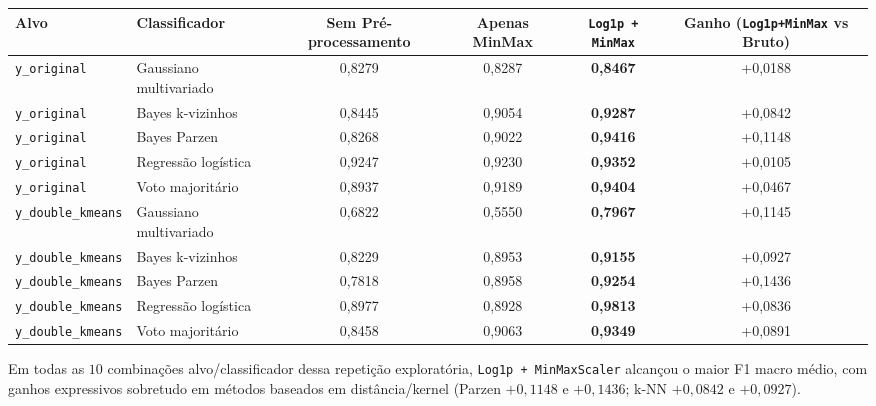 \documentclass[a4paper,11pt]{article}
\begin{document}
\begin{center}
\begin{minipage}{\linewidth}
\centering
{}
\footnotesize
\sloppy
\setlength{\tabcolsep}{2.5pt}
\renewcommand{\arraystretch}{1.18}
\begin{tabularx}{\linewidth}{P{2.25cm} P{2.85cm} C C C C}
\toprule
\textbf{Alvo} & \textbf{Classificador} & \textbf{Sem Pré-processamento} & \textbf{Apenas MinMax} & \textbf{\texttt{Log1p + MinMax}} & \textbf{Ganho (\texttt{Log1p+MinMax} vs Bruto)} \\
\midrule
\texttt{y\_\allowbreak original} & Gaussiano multivariado & 0,8279 & 0,8287 & \textbf{0,8467} & +0,0188 \\
\texttt{y\_\allowbreak original} & Bayes k-vizinhos & 0,8445 & 0,9054 & \textbf{0,9287} & +0,0842 \\
\texttt{y\_\allowbreak original} & Bayes Parzen & 0,8268 & 0,9022 & \textbf{0,9416} & +0,1148 \\
\texttt{y\_\allowbreak original} & Regressão logística & 0,9247 & 0,9230 & \textbf{0,9352} & +0,0105 \\
\texttt{y\_\allowbreak original} & Voto majoritário & 0,8937 & 0,9189 & \textbf{0,9404} & +0,0467 \\
\texttt{y\_\allowbreak double\_\allowbreak kmeans} & Gaussiano multivariado & 0,6822 & 0,5550 & \textbf{0,7967} & +0,1145 \\
\texttt{y\_\allowbreak double\_\allowbreak kmeans} & Bayes k-vizinhos & 0,8229 & 0,8953 & \textbf{0,9155} & +0,0927 \\
\texttt{y\_\allowbreak double\_\allowbreak kmeans} & Bayes Parzen & 0,7818 & 0,8958 & \textbf{0,9254} & +0,1436 \\
\texttt{y\_\allowbreak double\_\allowbreak kmeans} & Regressão logística & 0,8977 & 0,8928 & \textbf{0,9813} & +0,0836 \\
\texttt{y\_\allowbreak double\_\allowbreak kmeans} & Voto majoritário & 0,8458 & 0,9063 & \textbf{0,9349} & +0,0891 \\
\bottomrule
\end{tabularx}
\end{minipage}
\end{center}


Em todas as $10$ combinações alvo/classificador dessa repetição exploratória, \texttt{Log1p + MinMaxScaler} alcançou o maior F1 macro médio, com ganhos expressivos sobretudo em métodos baseados em distância/kernel (Parzen $+0,1148$ e $+0,1436$; k-NN $+0,0842$ e $+0,0927$).
\end{document}
